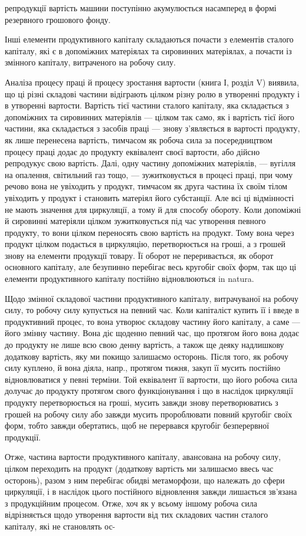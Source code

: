 репродукції вартість машини поступінно акумулюється насамперед в формі резервного грошового фонду.

Інші елементи продуктивного капіталу складаються почасти з елементів сталого капіталу, які є в
допоміжних матеріялах та сировинних матеріялах, а почасти із змінного капіталу, витраченого на
робочу силу.

Аналіза процесу праці й процесу зростання вартости (книга І, розділ V) виявила, що ці різні складові
частини відіграють цілком різну ролю в утворенні продукту і в утворенні вартости. Вартість тієї
частини сталого капіталу, яка складається з допоміжних та сировинних матеріялів — цілком так само,
як і вартість тієї його частини, яка складається з засобів праці — знову з’являється в вартості
продукту, як лише перенесена вартість, тимчасом як робоча сила за посередництвом процесу праці додає
до продукту еквівалент своєї вартости, або дійсно репродукує свою вартість. Далі, одну частину
допоміжних матеріялів, — вугілля на опалення, світильний газ тощо, — зужитковується в процесі праці,
при чому речово вона не увіходить у продукт, тимчасом як друга частина їх своїм тілом увіходить у
продукт і становить матеріял його субстанції. Але всі ці відмінності не мають значення для
циркуляції, а тому й для способу обороту. Коли допоміжні й сировинні матеріяли цілком зужитковується
під час утворення певного продукту, то вони цілком переносять свою вартість на продукт. Тому вона
через продукт цілком подається в циркуляцію, перетворюється на гроші, а з грошей знову на елементи
продукції товару. Її оборот не переривається, як оборот основного капіталу, але безупинно перебігає
весь кругобіг своїх форм, так що ці елементи продуктивного капіталу постійно відновлюються in
natura.

Щодо змінної складової частини продуктивного капіталу, витрачуваної на робочу силу, то робочу силу
купується на певний час. Коли капіталіст купить її і введе в продуктивний процес, то вона утворює
складову частину його капіталу, а саме — його змінну частину. Вона діє щоденно певний час, що
протягом його вона додає до продукту не лише всю свою денну вартість, а також ще деяку надлишкову
додаткову вартість, яку ми покищо залишаємо осторонь. Після того, як робочу силу куплено, й вона
діяла, напр., протягом тижня, закуп її мусить постійно відновлюватися у певні терміни. Той
еквівалент її вартости, що його робоча сила долучає до продукту протягом свого функціонування і що в
наслідок циркуляції продукту перетворюється на гроші, мусить завжди знову перетворюватись з грошей
на робочу силу або завжди мусить пророблювати повний кругобіг своїх форм, тобто завжди обертатись,
щоб не перервався кругобіг безперервної продукції.

Отже, частина вартости продуктивного капіталу, авансована на робочу силу, цілком переходить на
продукт (додаткову вартість ми залишаємо ввесь час осторонь), разом з ним перебігає обидві
метаморфози, що належать до сфери циркуляції, і в наслідок цього постійного відновлення завжди
лишається зв’язана з продукційним процесом. Отже, хоч як у всьому іншому робоча сила відрізняється
щодо утворення вартости від тих складових частин сталого капіталу, які не становлять ос-
